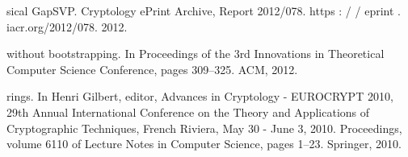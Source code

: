 \documentclass[A4paper,12pt]{article}
\begin{document}
\newpage
\begin{thebibliography}{99}
	
	
	sical GapSVP. Cryptology ePrint Archive, Report 2012/078. https : / / eprint .
	iacr.org/2012/078. 2012.
	
	
	
	
	
	
	without bootstrapping. In Proceedings of the 3rd Innovations in Theoretical Computer Science Conference,
	pages 309–325. ACM, 2012.
	
	rings. In Henri Gilbert, editor, Advances in Cryptology - EUROCRYPT 2010, 29th Annual International
	Conference on the Theory and Applications of Cryptographic Techniques, French Riviera, May 30 - June
	3, 2010. Proceedings, volume 6110 of Lecture Notes in Computer Science, pages 1–23. Springer, 2010.
	
	
\end{thebibliography}
\end{document}
